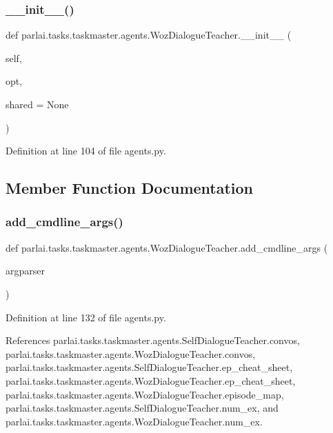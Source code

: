 \subsubsection{\texorpdfstring{\+\_\+\+\_\+init\+\_\+\+\_\+()}{\_\_init\_\_()}}
{\footnotesize\ttfamily def parlai.\+tasks.\+taskmaster.\+agents.\+Woz\+Dialogue\+Teacher.\+\_\+\+\_\+init\+\_\+\+\_\+ (\begin{DoxyParamCaption}\item[{}]{self,  }\item[{}]{opt,  }\item[{}]{shared = {\ttfamily None} }\end{DoxyParamCaption})}



Definition at line 104 of file agents.\+py.



\subsection{Member Function Documentation}
\mbox{\label{classparlai_1_1tasks_1_1taskmaster_1_1agents_1_1WozDialogueTeacher_a4af3fe28fd0b7558ddf7ed93c311c722}} 
\subsubsection{\texorpdfstring{add\+\_\+cmdline\+\_\+args()}{add\_cmdline\_args()}}
{\footnotesize\ttfamily def parlai.\+tasks.\+taskmaster.\+agents.\+Woz\+Dialogue\+Teacher.\+add\+\_\+cmdline\+\_\+args (\begin{DoxyParamCaption}\item[{}]{argparser }\end{DoxyParamCaption})\hspace{0.3cm}{\ttfamily [static]}}



Definition at line 132 of file agents.\+py.



References parlai.\+tasks.\+taskmaster.\+agents.\+Self\+Dialogue\+Teacher.\+convos, parlai.\+tasks.\+taskmaster.\+agents.\+Woz\+Dialogue\+Teacher.\+convos, parlai.\+tasks.\+taskmaster.\+agents.\+Self\+Dialogue\+Teacher.\+ep\+\_\+cheat\+\_\+sheet, parlai.\+tasks.\+taskmaster.\+agents.\+Woz\+Dialogue\+Teacher.\+ep\+\_\+cheat\+\_\+sheet, parlai.\+tasks.\+taskmaster.\+agents.\+Woz\+Dialogue\+Teacher.\+episode\+\_\+map, parlai.\+tasks.\+taskmaster.\+agents.\+Self\+Dialogue\+Teacher.\+num\+\_\+ex, and parlai.\+tasks.\+taskmaster.\+agents.\+Woz\+Dialogue\+Teacher.\+num\+\_\+ex.

